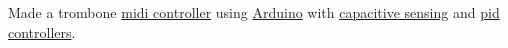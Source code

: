 {Made a trombone \href{https://en.wikipedia.org/wiki/MIDI_controller}{midi controller} using \href{https://www.pjrc.com/store/teensy40.html}{Arduino} with \href{https://en.wikipedia.org/wiki/Capacitive_sensing}{capacitive sensing} and \href{https://en.wikipedia.org/wiki/PID_controller}{pid controllers}.}
